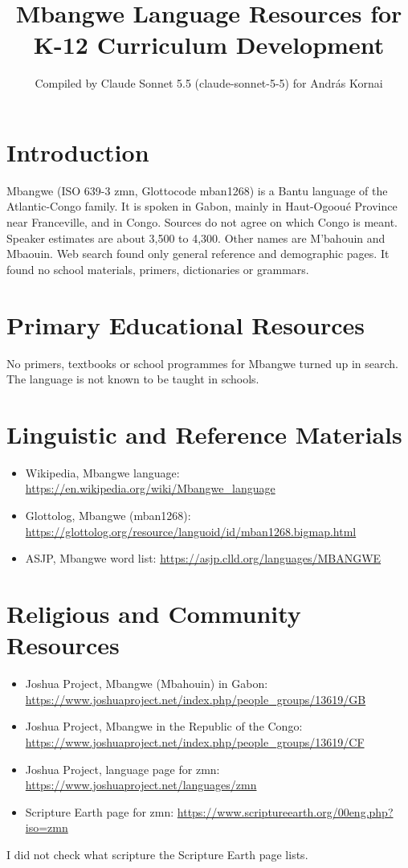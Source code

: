 \documentclass[12pt]{article}
\title{Mbangwe Language Resources for K-12 Curriculum Development}
\author{Compiled by Claude Sonnet 5.5 (claude-sonnet-5-5) for Andr\'as Kornai}
\date{}
\begin{document}
\maketitle

\section{Introduction}
Mbangwe (ISO 639-3 zmn, Glottocode mban1268) is a Bantu language of the Atlantic-Congo family. It is spoken in Gabon, mainly in Haut-Ogoou\'e Province near Franceville, and in Congo. Sources do not agree on which Congo is meant. Speaker estimates are about 3,500 to 4,300. Other names are M'bahouin and Mbaouin. Web search found only general reference and demographic pages. It found no school materials, primers, dictionaries or grammars.

\section{Primary Educational Resources}
No primers, textbooks or school programmes for Mbangwe turned up in search. The language is not known to be taught in schools.

\section{Linguistic and Reference Materials}
\begin{itemize}
\item Wikipedia, Mbangwe language: \url{https://en.wikipedia.org/wiki/Mbangwe_language}
\item Glottolog, Mbangwe (mban1268): \url{https://glottolog.org/resource/languoid/id/mban1268.bigmap.html}
\item ASJP, Mbangwe word list: \url{https://asjp.clld.org/languages/MBANGWE}
\end{itemize}

\section{Religious and Community Resources}
\begin{itemize}
\item Joshua Project, Mbangwe (Mbahouin) in Gabon: \url{https://www.joshuaproject.net/index.php/people_groups/13619/GB}
\item Joshua Project, Mbangwe in the Republic of the Congo: \url{https://www.joshuaproject.net/index.php/people_groups/13619/CF}
\item Joshua Project, language page for zmn: \url{https://www.joshuaproject.net/languages/zmn}
\item Scripture Earth page for zmn: \url{https://www.scriptureearth.org/00eng.php?iso=zmn}
\end{itemize}
I did not check what scripture the Scripture Earth page lists.
\end{document}

